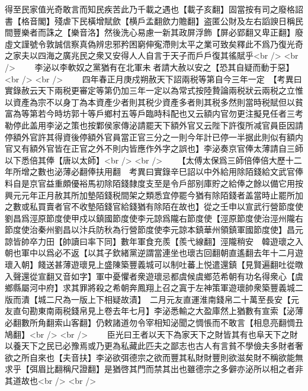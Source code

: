 得至民家值光奇敢言而知民疾苦此乃千載之遇也【載子亥翻】固當按有司之廢格詔書【格音閣】殘虐下民橫增賦歛【横戶孟翻歛力贍翻】盗匿公財及左右謟諛日稱民間豐樂者而誅之【樂音洛】然後洗心易慮一新其政屏浮飾【屏必郢翻又卑正翻】廢虛文謹號令敦誠信察真偽辨忠邪矜困窮伸寃滯則太平之業可致矣釋此不爲乃復光奇之家夫以四海之廣兆民之衆又安得人人自言于天子而戶戶復其徭賦乎<br />
<br />
　　李泌以李軟奴之黨猶有在北軍未者請大赦以安之【恐其自疑而動于惡】<br />
<br />
　　四年春正月庚戍朔赦天下詔兩税等第自今三年一定　【考異曰實錄赦云天下兩税更審定等第仍加三年一定以為常式按陸贄論兩税狀云兩税之立惟以資產為宗不以身丁為本資產少者則其税少資產多者則其税多然則當時税賦但以貧富為等第若今時坊郭十等戶鄉村五等戶臨時科配也又云額内官勿更注擬見任者三考勒停此盖用李泌之策也按鄴侯家傳泌請罷天下額外官又云陛下許復所减官員臣因請停額外官許其得資後停額外官員當正官三分之一則今年計已停一半据此則似有額内官又有額外官皆在正官之外不則内皆應作外字之誤也】李泌奏京官俸太薄請自三師以下悉倍其俸【唐以太師】<br />
<br />
　　【太傅太保爲三師倍俸倍大歷十二年所增之數也泌薄必翻俸扶用翻　考異曰實錄辛巳詔以中外給用除陌錢給文武官俸料自是京官益重頗優裕馬初除陌錢隸度支至是令戶部别庫貯之給俸之餘以備它用按興元元年正月赦其所加墊陌錢税間架之類悉宜停罷今猶有除陌錢者盖當時止罷所加之數或私買賣者官不收墊陌錢官給錢猶有除陌在故也】從之壬申以宣武行營節度使劉昌爲涇原節度使甲戍以鎮國節度使李元諒爲隴右節度使【涇原節度使治涇州隴右節度使治秦州劉昌以汴兵防秋為行營節度使李元諒本鎮華州領鎮軍國節度使】昌元諒皆帥卒力田【帥讀曰率下同】數年軍食充羨【羨弋線翻】涇隴稍安　韓遊瓌之入朝也軍中以爲必不返【以其子欽緒黨逆謂當連坐也瓌古回翻朝直遙翻去年十二月遊瓌入朝】餞送甚薄遊瓌見上盛陳築豐義城可以制吐蕃上悦遣還鎮【見賢遍翻吐從暾入聲還從宣翻又音如字】軍中憂懼者衆遊瓌忌都虞候虞鄉范希朝有功名得衆心【虞鄉縣屬河中府】求其罪將殺之希朝奔鳳翔上召之寘于左神策軍遊瓌帥衆築豐義城二版而潰【城二尺為一版上下相疑故漬】　二月元友直運淮南錢帛二十萬至長安【元友直句勘東南兩税錢帛見上卷去年七月】李泌悉輸之大盈庫然上猶數有宣索【泌薄必翻數所角翻索山客翻】仍敕諸道勿令宰相知泌聞之惆悵而不敢言【相息亮翻惆丑鳩翻】<br />
<br />
　　臣光曰王者以天下為家天下之財皆其有也阜天下之財以養天下之民已必豫焉或乃更為私藏此匹夫之鄙志也古人有言貧不學儉夫多財者奢欲之所自來也【夫音扶】李泌欲弭德宗之欲而豐其私財財豐則欲滋矣財不稱欲能無求乎【弭眉比翻稱尺證翻】是猶啓其門而禁其出也雖德宗之多僻亦泌所以相之者非其道故也<br />
<br />
